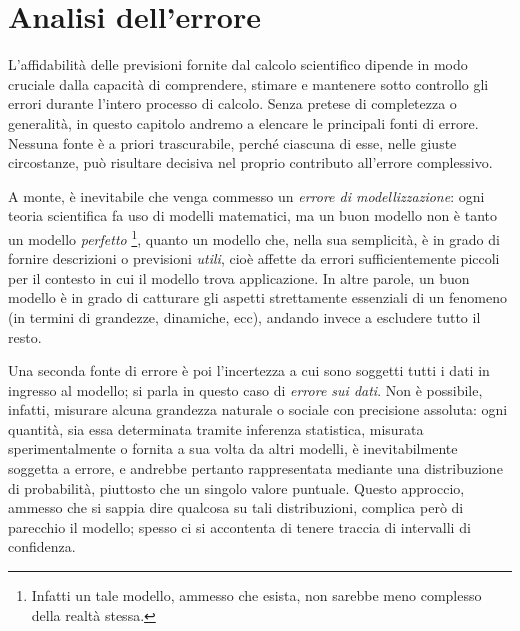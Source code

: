 \section{Analisi dell'errore} \label{sec:errore}

L'affidabilità delle previsioni fornite dal calcolo scientifico
dipende in modo cruciale dalla capacità di comprendere,
stimare e mantenere sotto controllo gli errori durante l'intero processo di calcolo.
Senza pretese di completezza o generalità,
in questo capitolo andremo a elencare le principali fonti di errore.
Nessuna fonte è a priori trascurabile, perché
ciascuna di esse, nelle giuste circostanze, può risultare decisiva
nel proprio contributo all'errore complessivo.

A monte, è inevitabile che venga commesso un \emph{errore di modellizzazione}:
ogni teoria scientifica fa uso di modelli matematici, ma
un buon modello non è tanto un modello \emph{perfetto}%
\footnote{Infatti un tale modello, ammesso che esista,
non sarebbe meno complesso della realtà stessa.},
quanto un modello che, nella sua semplicità, è in grado di fornire descrizioni o
previsioni \emph{utili}, cioè affette da errori sufficientemente piccoli
per il contesto in cui il modello trova applicazione.
In altre parole, un buon modello è in grado di catturare
gli aspetti strettamente essenziali di un fenomeno
(in termini di grandezze, dinamiche, ecc),
andando invece a escludere tutto il resto.

Una seconda fonte di errore è poi l'incertezza
a cui sono soggetti tutti i dati in ingresso al modello;
si parla in questo caso di \emph{errore sui dati}.
Non è possibile, infatti, misurare alcuna grandezza
naturale o sociale con precisione assoluta:
ogni quantità, sia essa determinata tramite inferenza statistica,
misurata sperimentalmente o fornita a sua volta da altri modelli,
è inevitabilmente soggetta a errore, e andrebbe pertanto rappresentata mediante una
distribuzione di probabilità, piuttosto che un singolo valore puntuale.
Questo approccio, ammesso che si sappia dire qualcosa su tali distribuzioni,
complica però di parecchio il modello; spesso ci si accontenta di tenere
traccia di intervalli di confidenza.

